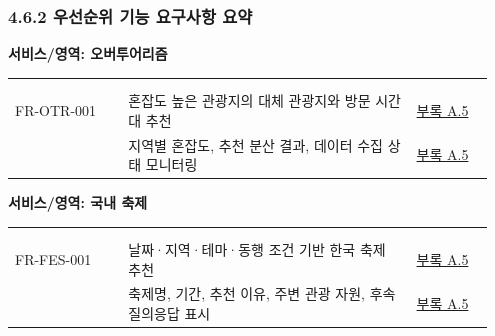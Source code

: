 \documentclass[12pt,a4paper]{article}
\makeatletter
\newcommand{\DocNeedspace}[1]{\par\ifdim\dimexpr\pagegoal-\pagetotal\relax<#1\newpage\fi}
\renewcommand{\arraystretch}{1.35}
\newcommand{\DocTableContinue}[2]{\multicolumn{#1}{@{}l@{}}{\footnotesize\textbf{#2 (계속)}} \\}
\newcommand{\AppendixRef}[2]{\hyperlink{app:#1#2}{부록 #1.#2}}
\makeatother
\begin{document}
\newpage
\DocNeedspace{5\baselineskip}
\subsubsection*{4.6.2 우선순위 기능 요구사항 요약}


\newcommand{\ReqSummaryAreaTitle}[2]{%
\DocNeedspace{#1\baselineskip}%
{\normalsize\bfseries\textcolor{SubTextGray}{서비스/영역: }\textcolor{DarkCharcoal}{#2}\par}%
\vspace{2pt}%
}
\newenvironment{ReqSummarySplitTable}{%
\begin{small}%
\setlength{\tabcolsep}{3pt}%
\setlength{\extrarowheight}{1pt}%
\renewcommand{\arraystretch}{1.26}%
\begin{longtable}{@{}>{\centering\arraybackslash}m{0.220\linewidth}>{\RaggedRight\arraybackslash}m{0.570\linewidth}>{\centering\arraybackslash}m{0.157\linewidth}@{}}%
\toprule
\multicolumn{1}{>{\centering\arraybackslash}m{0.220\linewidth}}{\textbf{ID}} & \multicolumn{1}{>{\centering\arraybackslash}m{0.570\linewidth}}{\textbf{핵심 요구}} & \multicolumn{1}{>{\centering\arraybackslash}m{0.157\linewidth}}{\textbf{상세 위치}} \\
\midrule
\endfirsthead
\toprule
\DocTableContinue{3}{4.6.2 우선순위 기능 요구사항 요약}
\midrule
\multicolumn{1}{>{\centering\arraybackslash}m{0.220\linewidth}}{\textbf{ID}} & \multicolumn{1}{>{\centering\arraybackslash}m{0.570\linewidth}}{\textbf{핵심 요구}} & \multicolumn{1}{>{\centering\arraybackslash}m{0.157\linewidth}}{\textbf{상세 위치}} \\
\midrule
\endhead
}{%
\bottomrule
\end{longtable}%
\end{small}%
\vspace{4pt}%
}

\ReqSummaryAreaTitle{9}{오버투어리즘}
\begin{ReqSummarySplitTable}
{\footnotesize FR-\allowbreak{}OTR-\allowbreak{}001} & 혼잡도 높은 관광지의 대체 관광지와 방문 시간대 추천 & \AppendixRef{A}{5} \\
{\footnotesize FR-\allowbreak{}OTR-\allowbreak{}002} & 지역별 혼잡도, 추천 분산 결과, 데이터 수집 상태 모니터링 & \AppendixRef{A}{5} \\
\end{ReqSummarySplitTable}

\ReqSummaryAreaTitle{9}{국내 축제}
\begin{ReqSummarySplitTable}
{\footnotesize FR-\allowbreak{}FES-\allowbreak{}001} & 날짜·지역·테마·동행 조건 기반 한국 축제 추천 & \AppendixRef{A}{5} \\
{\footnotesize FR-\allowbreak{}FES-\allowbreak{}002} & 축제명, 기간, 추천 이유, 주변 관광 자원, 후속 질의응답 표시 & \AppendixRef{A}{5} \\
\end{ReqSummarySplitTable}
\end{document}
